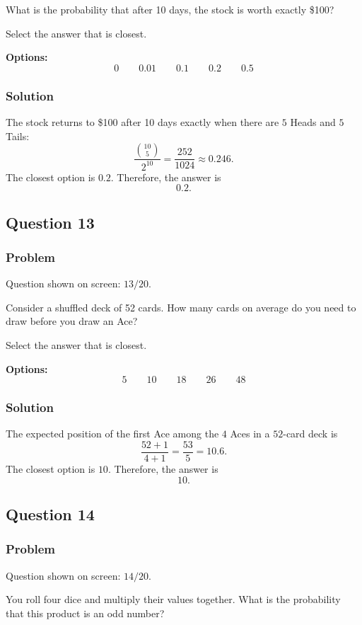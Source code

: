 \documentclass[12pt]{article}
\begin{document}
What is the probability that after 10 days, the stock is worth exactly \$100?

Select the answer that is closest.

\noindent\textbf{Options:}
\[
\boxed{0}
\qquad
\boxed{0.01}
\qquad
\boxed{0.1}
\qquad
\boxed{0.2}
\qquad
\boxed{0.5}
\]

\subsubsection{Solution}
The stock returns to \$100 after 10 days exactly when there are \(5\) Heads and \(5\) Tails:
\[
\frac{\binom{10}{5}}{2^{10}}=\frac{252}{1024}\approx 0.246.
\]
The closest option is \(0.2\). Therefore, the answer is
\[
\boxed{0.2}.
\]

\subsection{Question 13}
\subsubsection{Problem}
Question shown on screen: \(13/20\).

Consider a shuffled deck of 52 cards. How many cards on average do you need to draw before you draw an Ace?

Select the answer that is closest.

\noindent\textbf{Options:}
\[
\boxed{5}
\qquad
\boxed{10}
\qquad
\boxed{18}
\qquad
\boxed{26}
\qquad
\boxed{48}
\]

\subsubsection{Solution}
The expected position of the first Ace among the \(4\) Aces in a \(52\)-card deck is
\[
\frac{52+1}{4+1}=\frac{53}{5}=10.6.
\]
The closest option is \(10\). Therefore, the answer is
\[
\boxed{10}.
\]

\subsection{Question 14}
\subsubsection{Problem}
Question shown on screen: \(14/20\).

You roll four dice and multiply their values together. What is the probability that this product is an odd number?
\end{document}
